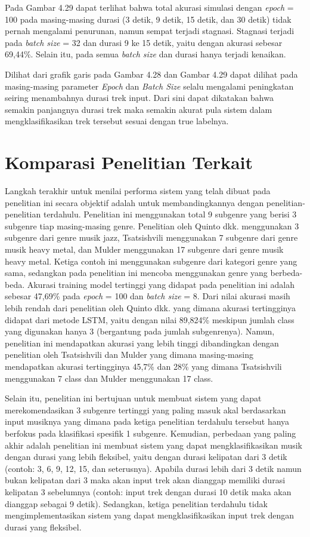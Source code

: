 Pada Gambar 4.29 dapat terlihat bahwa total akurasi simulasi dengan \emph{epoch} = 100 pada masing-masing durasi (3 detik, 9 detik, 15 detik, dan 30 detik) tidak pernah mengalami penurunan, namun sempat terjadi stagnasi. Stagnasi terjadi pada \emph{batch size} = 32 dan durasi 9 ke 15 detik, yaitu dengan akurasi sebesar 69,44\%. Selain itu, pada semua \emph{batch size} dan durasi hanya terjadi kenaikan.

Dilihat dari grafik garis pada Gambar 4.28 dan Gambar 4.29 dapat dilihat pada masing-masing parameter \emph{Epoch} dan \emph{Batch Size} selalu mengalami peningkatan seiring menambahnya durasi trek input. Dari sini dapat dikatakan bahwa semakin panjangnya durasi trek maka semakin akurat pula sistem dalam mengklasifikasikan trek tersebut sesuai dengan true labelnya.

\section{Komparasi Penelitian Terkait}
\label{sec:komparasipenelitian}

Langkah terakhir untuk menilai performa sistem yang telah dibuat pada penelitian ini secara objektif adalah untuk membandingkannya dengan penelitian-penelitian terdahulu. Penelitian ini menggunakan total 9 subgenre yang berisi 3 subgenre tiap masing-masing genre. Penelitian oleh Quinto dkk. \citep{quinto} menggunakan 3 subgenre dari genre musik jazz, Tsatsishvili \cite{tsatsishvili} menggunakan 7 subgenre dari genre musik heavy metal, dan Mulder \citep{Mulder2014AutomaticCO} menggunakan 17 subgenre dari genre musik heavy metal. Ketiga contoh ini menggunakan subgenre dari kategori genre yang sama, sedangkan pada penelitian ini mencoba menggunakan genre yang berbeda-beda. Akurasi training model tertinggi yang didapat pada penelitian ini adalah sebesar 47,69\% pada \emph{epoch} = 100 dan \emph{batch size} = 8. Dari nilai akurasi masih lebih rendah dari penelitian oleh Quinto dkk. yang dimana akurasi tertingginya didapat dari metode LSTM, yaitu dengan nilai 89,824\% meskipun jumlah class yang digunakan hanya 3 (bergantung pada jumlah subgenrenya). Namun, penelitian ini mendapatkan akurasi yang lebih tinggi dibandingkan dengan penelitian oleh Tsatsishvili dan Mulder yang dimana masing-masing mendapatkan akurasi tertingginya 45,7\% dan 28\% yang dimana Tsatsishvili menggunakan 7 class dan Mulder menggunakan 17 class.

Selain itu, penelitian ini bertujuan untuk membuat sistem yang dapat merekomendasikan 3 subgenre tertinggi yang paling masuk akal berdasarkan input musiknya yang dimana pada ketiga penelitian terdahulu tersebut hanya berfokus pada klasifikasi spesifik 1 subgenre. Kemudian, perbedaan yang paling akhir adalah penelitian ini membuat sistem yang dapat mengklasifikasikan musik dengan durasi yang lebih fleksibel, yaitu dengan durasi kelipatan dari 3 detik (contoh: 3, 6, 9, 12, 15, dan seterusnya). Apabila durasi lebih dari 3 detik namun bukan kelipatan dari 3 maka akan input trek akan dianggap memiliki durasi kelipatan 3 sebelumnya (contoh: input trek dengan durasi 10 detik maka akan dianggap sebagai 9 detik). Sedangkan, ketiga penelitian terdahulu tidak mengimplementasikan sistem yang dapat mengklasifikasikan input trek dengan durasi yang fleksibel.